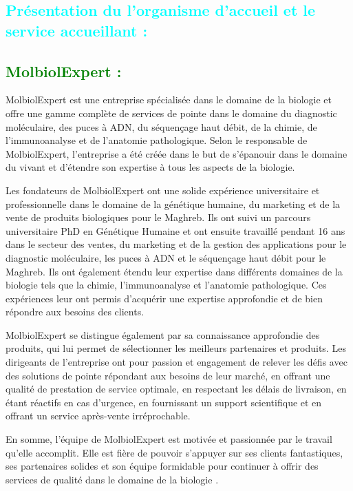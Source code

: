 \begin{flushleft}
	\section{\textcolor{cyan}{Présentation du l’organisme d’accueil et le service accueillant : }}
	\subsection{\textcolor{green}{MolbiolExpert :}}

	MolbiolExpert est une entreprise spécialisée dans le domaine de la biologie et offre une gamme complète de services de pointe dans le domaine du diagnostic moléculaire, des puces à ADN, du séquençage haut débit, de la chimie, de l'immunoanalyse et de l'anatomie pathologique. Selon le responsable de MolbiolExpert, l'entreprise a été créée dans le but de s'épanouir dans le domaine du vivant et d'étendre son expertise à tous les aspects de la biologie. \newline
	
	Les fondateurs de MolbiolExpert ont une solide expérience universitaire et professionnelle dans le domaine de la génétique humaine, du marketing et de la vente de produits biologiques pour le Maghreb. Ils ont suivi un parcours universitaire PhD en Génétique Humaine et ont ensuite travaillé pendant 16 ans dans le secteur des ventes, du marketing et de la gestion des applications pour le diagnostic moléculaire, les puces à ADN et le séquençage haut débit pour le Maghreb. Ils ont également étendu leur expertise dans différents domaines de la biologie tels que la chimie, l'immunoanalyse et l'anatomie pathologique. Ces expériences leur ont permis d'acquérir une expertise approfondie et de bien répondre aux besoins des clients. \newline
	
	MolbiolExpert se distingue également par sa connaissance approfondie des produits, qui lui permet de sélectionner les meilleurs partenaires et produits. Les dirigeants de l'entreprise ont pour passion et engagement de relever les défis avec des solutions de pointe répondant aux besoins de leur marché, en offrant une qualité de prestation de service optimale, en respectant les délais de livraison, en étant réactifs en cas d'urgence, en fournissant un support scientifique et en offrant un service après-vente irréprochable. \newline
	
	En somme, l'équipe de MolbiolExpert est motivée et passionnée par le travail qu'elle accomplit. Elle est fière de pouvoir s'appuyer sur ses clients fantastiques, ses partenaires solides et son équipe formidable pour continuer à offrir des services de qualité dans le domaine de la biologie . \newline
	

\end{flushleft}
